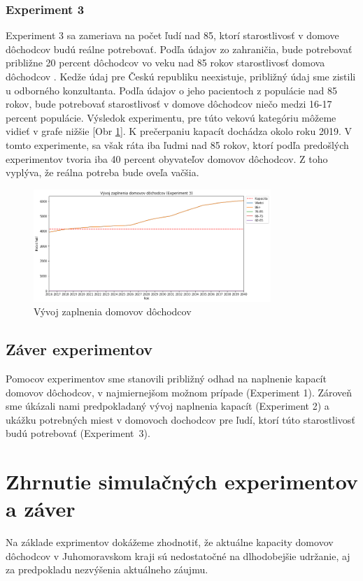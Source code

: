 \documentclass[a4paper, 11pt]{article}
\begin{document}
\subsubsection{Experiment 3}
Experiment 3 sa zameriava na počet ľudí nad 85, ktorí starostlivosť v domove dôchodcov budú reálne potrebovať. Podľa údajov zo zahraničia, bude potrebovať približne 20 percent dôchodcov vo veku nad 85 rokov starostlivosť domova dôchodcov \cite{amerika}. Kedže údaj pre Českú republiku neexistuje, približný údaj sme zistili u odborného konzultanta. Podľa údajov o jeho pacientoch z populácie nad 85 rokov, bude potrebovať starostlivosť v domove dôchodcov niečo medzi 16-17 percent populácie. Výsledok experimentu, pre túto vekovú kategóriu môžeme vidieť v grafe nižšie [Obr \ref{exp_6}]. K prečerpaniu kapacít dochádza okolo roku 2019. V tomto experimente, sa však ráta iba ľudmi nad 85 rokov, ktorí podľa predošlých experimentov tvoria iba 40 percent obyvateľov domovov dôchodcov. Z toho vyplýva, že reálna potreba bude oveľa vačšia.
\begin{figure}[H]
\centering
\includegraphics[width=0.8\textwidth]{exp_6}
\caption{Vývoj zaplnenia domovov dôchodcov\label{exp_6}}
\end{figure}

\subsection{Záver experimentov}
Pomocov experimentov sme stanovili približný odhad na naplnenie kapacít domovov dôchodcov, v najmiernejšom možnom prípade (Experiment 1). Zároveň sme úkázali nami predpokladaný vývoj naplnenia kapacít (Experiment 2) a ukážku potrebných miest v domovoch dochodcov pre ľudí, ktorí túto starostlivosť budú potrebovať (Experiment~3).

\section{Zhrnutie simulačných experimentov a záver}
Na základe exprimentov dokážeme zhodnotiť, že aktuálne kapacity domovov dôchodcov v Juhomoravskom kraji sú nedostatočné na dlhodobejšie udržanie, aj za predpokladu nezvýšenia aktuálneho záujmu.
\end{document}

